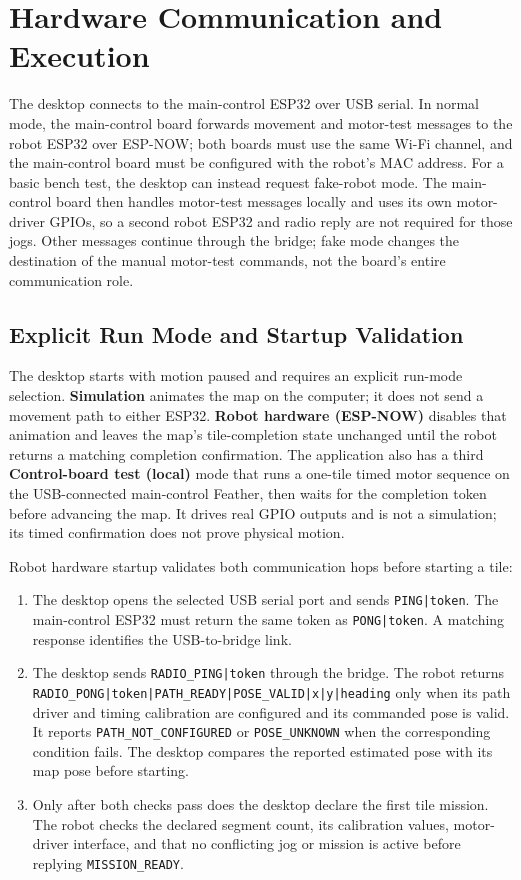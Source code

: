 \documentclass{article}
\begin{document}
\section{Hardware Communication and Execution}

The desktop connects to the main-control ESP32 over USB serial. In normal mode, the main-control board forwards movement and motor-test messages to the robot ESP32 over ESP-NOW; both boards must use the same Wi-Fi channel, and the main-control board must be configured with the robot's MAC address. For a basic bench test, the desktop can instead request fake-robot mode. The main-control board then handles motor-test messages locally and uses its own motor-driver GPIOs, so a second robot ESP32 and radio reply are not required for those jogs. Other messages continue through the bridge; fake mode changes the destination of the manual motor-test commands, not the board's entire communication role.

\subsection{Explicit Run Mode and Startup Validation}

The desktop starts with motion paused and requires an explicit run-mode selection. \textbf{Simulation} animates the map on the computer; it does not send a movement path to either ESP32. \textbf{Robot hardware (ESP-NOW)} disables that animation and leaves the map's tile-completion state unchanged until the robot returns a matching completion confirmation. The application also has a third \textbf{Control-board test (local)} mode that runs a one-tile timed motor sequence on the USB-connected main-control Feather, then waits for the completion token before advancing the map. It drives real GPIO outputs and is not a simulation; its timed confirmation does not prove physical motion.

Robot hardware startup validates both communication hops before starting a tile:
\begin{enumerate}
    \item The desktop opens the selected USB serial port and sends \texttt{PING|token}. The main-control ESP32 must return the same token as \texttt{PONG|token}. A matching response identifies the USB-to-bridge link.
    \item The desktop sends \texttt{RADIO\_PING|token} through the bridge. The robot returns \texttt{RADIO\_PONG|token|PATH\_READY|POSE\_VALID|x|y|heading} only when its path driver and timing calibration are configured and its commanded pose is valid. It reports \texttt{PATH\_NOT\_CONFIGURED} or \texttt{POSE\_UNKNOWN} when the corresponding condition fails. The desktop compares the reported estimated pose with its map pose before starting.
    \item Only after both checks pass does the desktop declare the first tile mission. The robot checks the declared segment count, its calibration values, motor-driver interface, and that no conflicting jog or mission is active before replying \texttt{MISSION\_READY}.
\end{enumerate}
\end{document}

